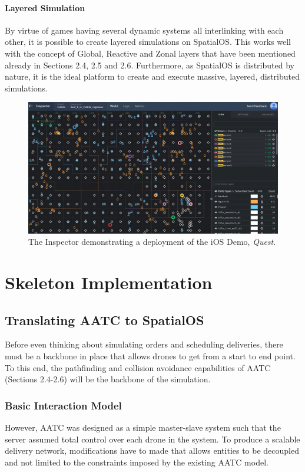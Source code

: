 \documentclass[a4paper,11pt,titlepage]{report}
\begin{document}
\subsection{Layered Simulation}
By virtue of games having several dynamic systems all interlinking with each other, it is possible to create layered simulations on SpatialOS. This works well with the concept of Global, Reactive and Zonal layers that have been mentioned already in Sections 2.4, 2.5 and 2.6. Furthermore, as SpatialOS is distributed by nature, it is the ideal platform to create and execute massive, layered, distributed simulations.

\begin{figure}[!hbpt]
  \center
  \includegraphics[width=\linewidth]{img/io_inspector.png}
  \caption{The Inspector demonstrating a deployment of the iOS Demo, \textit{Quest}. \cite{ImprobableWorldsLtd.2017}}
  \label{fig:bg_scalable_zones}
\end{figure}


\clearpage
\part{Skeleton Implementation}
\chapter{Translating AATC to SpatialOS}
Before even thinking about simulating orders and scheduling deliveries, there must be a backbone in place that allows drones to get from a start to end point. To this end, the pathfinding and collision avoidance capabilities of AATC (Sections 2.4-2.6) will be the backbone of the simulation.

\section{Basic Interaction Model}
However, AATC was designed as a simple master-slave system such that the server assumed total control over each drone in the system. To produce a scalable delivery network, modifications have to made that allows entities to be decoupled and not limited to the constraints imposed by the existing AATC model.
\end{document}
